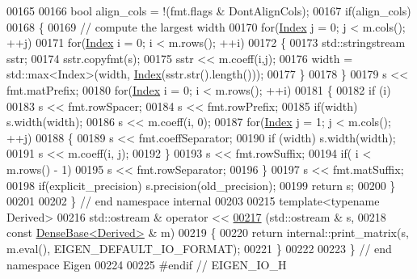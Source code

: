 \begin{DoxyCode}
00165 
00166   \textcolor{keywordtype}{bool} align\_cols = !(fmt.flags & DontAlignCols);
00167   \textcolor{keywordflow}{if}(align\_cols)
00168   \{
00169     \textcolor{comment}{// compute the largest width}
00170     \textcolor{keywordflow}{for}(\hyperlink{namespace_eigen_a62e77e0933482dafde8fe197d9a2cfde}{Index} j = 0; j < m.cols(); ++j)
00171       \textcolor{keywordflow}{for}(\hyperlink{namespace_eigen_a62e77e0933482dafde8fe197d9a2cfde}{Index} i = 0; i < m.rows(); ++i)
00172       \{
00173         std::stringstream sstr;
00174         sstr.copyfmt(s);
00175         sstr << m.coeff(i,j);
00176         width = std::max<Index>(width, \hyperlink{namespace_eigen_a62e77e0933482dafde8fe197d9a2cfde}{Index}(sstr.str().length()));
00177       \}
00178   \}
00179   s << fmt.matPrefix;
00180   \textcolor{keywordflow}{for}(\hyperlink{namespace_eigen_a62e77e0933482dafde8fe197d9a2cfde}{Index} i = 0; i < m.rows(); ++i)
00181   \{
00182     \textcolor{keywordflow}{if} (i)
00183       s << fmt.rowSpacer;
00184     s << fmt.rowPrefix;
00185     \textcolor{keywordflow}{if}(width) s.width(width);
00186     s << m.coeff(i, 0);
00187     \textcolor{keywordflow}{for}(\hyperlink{namespace_eigen_a62e77e0933482dafde8fe197d9a2cfde}{Index} j = 1; j < m.cols(); ++j)
00188     \{
00189       s << fmt.coeffSeparator;
00190       \textcolor{keywordflow}{if} (width) s.width(width);
00191       s << m.coeff(i, j);
00192     \}
00193     s << fmt.rowSuffix;
00194     \textcolor{keywordflow}{if}( i < m.rows() - 1)
00195       s << fmt.rowSeparator;
00196   \}
00197   s << fmt.matSuffix;
00198   \textcolor{keywordflow}{if}(explicit\_precision) s.precision(old\_precision);
00199   \textcolor{keywordflow}{return} s;
00200 \}
00201 
00202 \} \textcolor{comment}{// end namespace internal}
00203 
00215 \textcolor{keyword}{template}<\textcolor{keyword}{typename} Derived>
00216 std::ostream & \textcolor{keyword}{operator} <<
\hyperlink{group___core___module_a3806d3f42de165878dace160e6aba40a}{00217} (std::ostream & s,
00218  \textcolor{keyword}{const} \hyperlink{group___core___module_class_eigen_1_1_dense_base}{DenseBase<Derived>} & m)
00219 \{
00220   \textcolor{keywordflow}{return} internal::print\_matrix(s, m.eval(), EIGEN\_DEFAULT\_IO\_FORMAT);
00221 \}
00222 
00223 \} \textcolor{comment}{// end namespace Eigen}
00224 
00225 \textcolor{preprocessor}{#endif // EIGEN\_IO\_H}
\end{DoxyCode}
